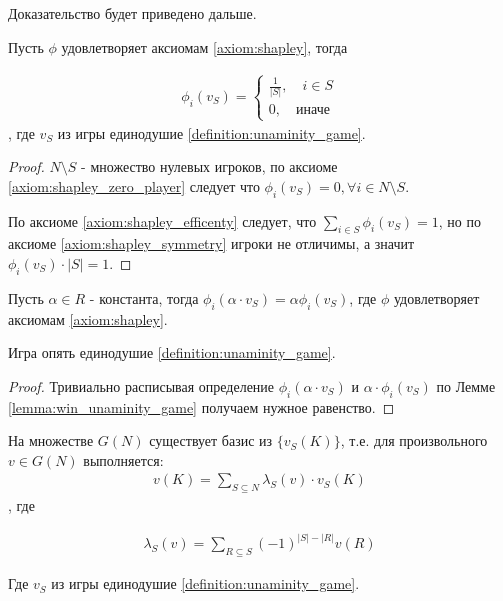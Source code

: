 \documentclass[../main.tex]{subfiles}
\begin{document}
Доказательство будет приведено дальше.

\begin{lm} \label{lemma:win_unaminity_game}
	Пусть $\phi $ удовлетворяет аксиомам \ref{axiom:shapley}, тогда 

	\begin{align*}
		\phi_i(v_S) = \begin{cases} 
			\frac{1}{|S|}, \quad i \in S \\
			0, \quad \text{иначе}
		\end{cases}
	\end{align*}, где $v_S$ из игры единодушие \ref{definition:unaminity_game}.

\end{lm}

\begin{proof}
	$N \setminus S$ - множество нулевых игроков, по аксиоме \eqref{axiom:shapley_zero_player} следует что  $\phi_i(v_S) = 0, \forall i \in N \setminus S$.

	По аксиоме \eqref{axiom:shapley_efficenty} следует, что  $\sum_{i \in S} \phi_i(v_S) = 1$, но по аксиоме \eqref{axiom:shapley_symmetry} игроки не отличимы, а значит  $\phi_i(v_S) \cdot |S| = 1$.
\end{proof}

\begin{lm} \label{lemma:uniformity_unaminity_game}
	Пусть $\alpha \in R$ - константа, тогда  $\phi_i(\alpha \cdot v_S) = \alpha \phi_i(v_S)$, где $\phi$ удовлетворяет аксиомам \ref{axiom:shapley}.

	Игра опять единодушие \ref{definition:unaminity_game}.
\end{lm}

\begin{proof}
	Тривиально расписывая определение $\phi_i(\alpha \cdot v_S)$ и  $\alpha \cdot \phi_i(v_S)$ по Лемме \ref{lemma:win_unaminity_game} получаем нужное равенство.
\end{proof}

\begin{lm} \label{lemma:basis_to_unaminity_game}
	На множестве $G(N)$ существует базис из  $\{v_S(K)\}$, т.е. для произвольного $v \in G(N)$ выполняется:
	\begin{align*}
		v(K) = \sum_{S \subseteq N} \lambda_S(v) \cdot v_S(K)
	\end{align*}, где 

	\begin{align*}
		\lambda_S(v) = \sum_{R \subseteq S} (-1)^{|S| - |R|} v(R)
	\end{align*}

	Где $v_S$ из игры единодушие \ref{definition:unaminity_game}.

\end{lm}
\end{document}
